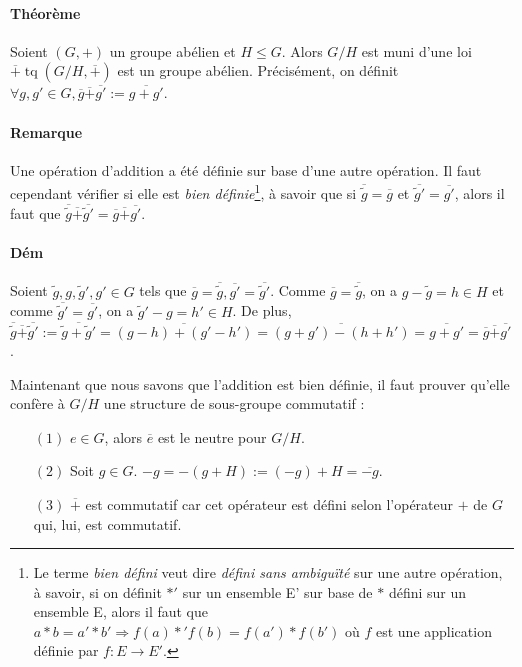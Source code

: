\documentclass{article}
\DeclareMathOperator{\tq}{\text{ tq }}
\begin{document}
			\paragraph{Théorème} Soient $(G, +)$ un groupe abélien et $H \leq G$. Alors $G/H$ est muni d'une loi $\overline + \tq (G/H, \overline +)$ est un
			groupe abélien. Précisément, on définit $\forall g, g' \in G, \overline g \overline + \overline {g'} := \overline {g + g'}$.

			\paragraph{Remarque} Une opération d'addition a été définie sur base d'une autre opération. Il faut cependant vérifier si elle est
			\textit{bien définie}\footnote{Le terme \textit{bien défini} veut dire \textit{défini sans ambiguïté} sur une autre opération, à savoir,
			si on définit $*'$ sur un ensemble E' sur base de $*$ défini sur un ensemble E, alors il faut que $a*b = a'*b' \Rightarrow f(a)*'f(b) = f(a')*f(b')$
			où $f$ est une application définie par $f : E \to E'$.}, à savoir que si $\overline{\widetilde g} = \overline{g}$ et
			$\overline{\widetilde{g}'} = \overline{g'}$, alors il faut que $\overline{\widetilde{g}} \overline{+} \overline{\widetilde{g}'} =
			\overline{g} \overline{+} \overline{g'}$.

			\paragraph{Dém} Soient $\widetilde{g}, g, \widetilde{g}', g' \in G$ tels que $\overline{g} = \overline{\widetilde{g}}, \overline{g'} = \overline{\widetilde{g}'}$.
			Comme $\overline{g} = \overline{\widetilde{g}}$, on a $g - \widetilde{g} = h \in H$ et comme $\overline{\widetilde{g}'} = \overline{g'}$, on a
			$\widetilde{g}' - g = h' \in H$. De plus, $\overline{\widetilde{g}} \overline{+} \overline{\widetilde{g}'} := \overline{\widetilde{g} + \widetilde{g}'}
			= \overline{(g-h) + (g'-h')} = \overline{(g+g') - (h+h')} = \overline{g+g'} = \overline{g} \overline{+} \overline{g'}$.

			Maintenant que nous savons que l'addition est bien définie, il faut prouver qu'elle confère à $G/H$ une structure de sous-groupe commutatif :

			\begin{itemize}
				\item[$(1)$] $e \in G$, alors $\overline{e}$ est le neutre pour $G/H$.
				\item[$(2)$] Soit $g \in G$. $-g = -(g+H) := (-g) + H = \overline{-g}$.
				\item[$(3)$] $\overline{+}$ est commutatif car cet opérateur est défini selon l'opérateur $+$ de $G$ qui, lui, est commutatif.
			\end{itemize}
\end{document}
